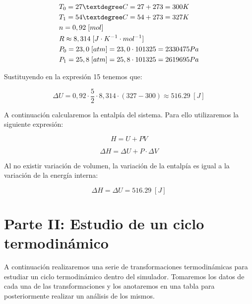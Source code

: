 \documentclass{article}
\begin{document}
\begin{equation}
    \begin{split}
        & T_0 = 27 \textdegree C = 27 + 273 = 300 K  \\
        & T_1 = 54 \textdegree C = 54 + 273 = 327 K  \\
        & n = 0,92 \; [mol] \\
        & R \approx 8,314 \; [J \cdot K^{-1} \cdot mol^{-1}] \\
        & P_0 = 23,0 \; [atm] = 23,0 \cdot 101325 = 2330475 Pa \\
        & P_1 = 25,8 \; [atm] = 25,8 \cdot 101325 = 2619695 Pa \\
    \end{split}
\end{equation}

Sustituyendo en la expresión 15 tenemos que:

\begin{equation}
    \Delta U = 0,92 \cdot \frac{5}{2} \cdot 8,314 \cdot (327 - 300) \approx 516.29 \; [J]
\end{equation}

A continuación calcularemos la entalpía del sistema. Para ello utilizaremos la siguiente expresión:

\begin{equation}
    H = U + PV
\end{equation}

\begin{equation}
    \Delta H = \Delta U + P \cdot \Delta V
\end{equation}

Al no existir variación de volumen, la variación de la entalpía es igual a la variación de la energía interna:

\begin{equation}
    \Delta H = \Delta U = 516.29 \; [J]
\end{equation}

\section{Parte II: Estudio de un ciclo termodinámico}

A continuación realizaremos una serie de transformaciones termodinámicas para estudiar un ciclo termodinámico dentro del simulador.
Tomaremos los datos de cada una de las transformaciones y los anotaremos en una tabla para posteriormente realizar un análisis de los mismos.
\end{document}
